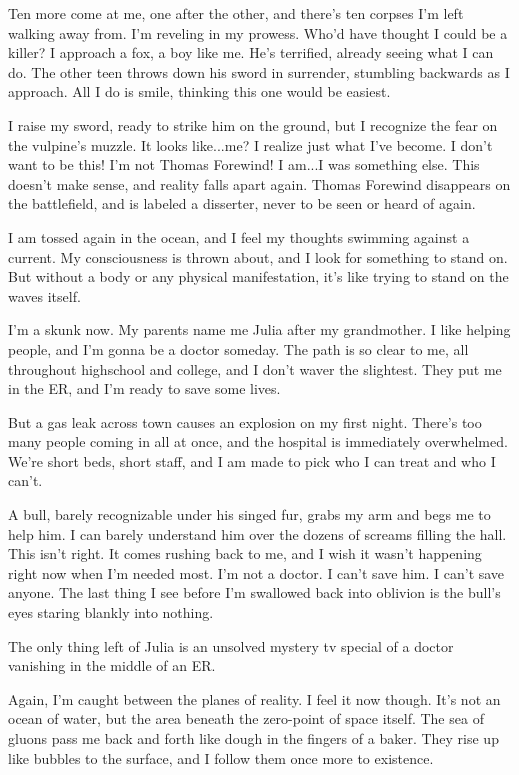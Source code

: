 Ten more come at me, one after the other, and there's ten corpses I'm
left walking away from. I'm reveling in my prowess. Who'd have thought I
could be a killer? I approach a fox, a boy like me. He's terrified,
already seeing what I can do. The other teen throws down his sword in
surrender, stumbling backwards as I approach. All I do is smile,
thinking this one would be easiest.

I raise my sword, ready to strike him on the ground, but I recognize the
fear on the vulpine's muzzle. It looks like...me? I realize just what
I've become. I don't want to be this! I'm not Thomas Forewind! I am...I
was something else. This doesn't make sense, and reality falls apart
again. Thomas Forewind disappears on the battlefield, and is labeled a
disserter, never to be seen or heard of again.

I am tossed again in the ocean, and I feel my thoughts swimming against
a current. My consciousness is thrown about, and I look for something to
stand on. But without a body or any physical manifestation, it's like
trying to stand on the waves itself.

I'm a skunk now. My parents name me Julia after my grandmother. I like
helping people, and I'm gonna be a doctor someday. The path is so clear
to me, all throughout highschool and college, and I don't waver the
slightest. They put me in the ER, and I'm ready to save some lives.

But a gas leak across town causes an explosion on my first night.
There's too many people coming in all at once, and the hospital is
immediately overwhelmed. We're short beds, short staff, and I am made to
pick who I can treat and who I can't.

A bull, barely recognizable under his singed fur, grabs my arm and begs
me to help him. I can barely understand him over the dozens of screams
filling the hall. This isn't right. It comes rushing back to me, and I
wish it wasn't happening right now when I'm needed most. I'm not a
doctor. I can't save him. I can't save anyone. The last thing I see
before I'm swallowed back into oblivion is the bull's eyes staring
blankly into nothing.

The only thing left of Julia is an unsolved mystery tv special of a
doctor vanishing in the middle of an ER.

Again, I'm caught between the planes of reality. I feel it now though.
It's not an ocean of water, but the area beneath the zero-point of space
itself. The sea of gluons pass me back and forth like dough in the
fingers of a baker. They rise up like bubbles to the surface, and I
follow them once more to existence.

